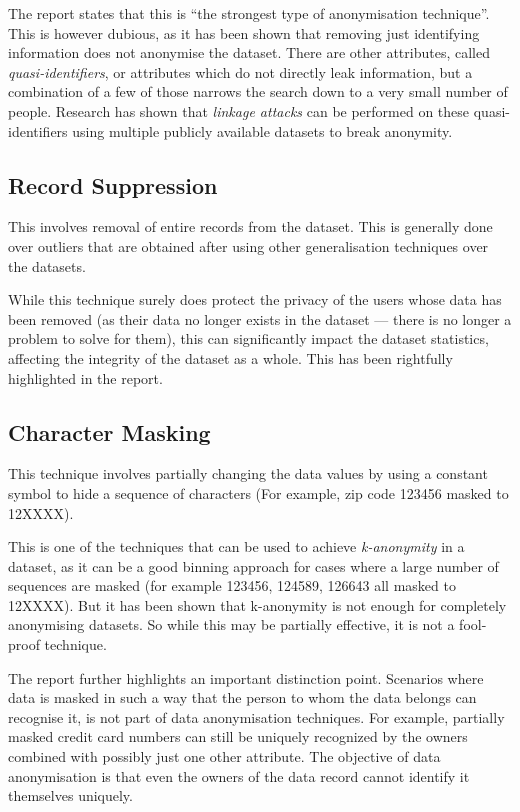 \documentclass[11pt, a4paper]{article}
\begin{document}
The report states that this is ``the strongest type of anonymisation technique''. This is however dubious, as it has been shown that removing just identifying information does not anonymise the dataset. There are other attributes, called \textit{quasi-identifiers}, or attributes which do not directly leak information, but a combination of a few of those narrows the search down to a very small number of people. Research has shown that \textit{linkage attacks} can be performed on these quasi-identifiers using multiple publicly available datasets to break anonymity.

\subsection{Record Suppression}

This involves removal of entire records from the dataset. This is generally done over outliers that are obtained after using other generalisation techniques over the datasets.

While this technique surely does protect the privacy of the users whose data has been removed (as their data no longer exists in the dataset --- there is no longer a problem to solve for them), this can significantly impact the dataset statistics, affecting the integrity of the dataset as a whole. This has been rightfully highlighted in the report.

\subsection{Character Masking}

This technique involves partially changing the data values by using a constant symbol to hide a sequence of characters (For example, zip code 123456 masked to 12XXXX). 

This is one of the techniques that can be used to achieve \textit{k-anonymity} in a dataset, as it can be a good binning approach for cases where a large number of sequences are masked (for example 123456, 124589, 126643 all masked to 12XXXX). But it has been shown that k-anonymity is not enough for completely anonymising datasets. So while this may be partially effective, it is not a fool-proof technique.

The report further highlights an important distinction point. Scenarios where data is masked in such a way that the person to whom the data belongs can recognise it, is not part of data anonymisation techniques. For example, partially masked credit card numbers can still be uniquely recognized by the owners combined with possibly just one other attribute. The objective of data anonymisation is that even the owners of the data record cannot identify it themselves uniquely.
\end{document}

